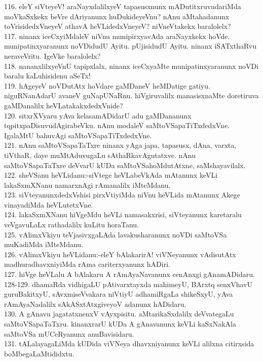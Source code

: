 \documentclass{article}
\begin{document}
116. eleY siVteyeV! araNayxdalilxyeV tapasusxnunx mADutitxruvudariMda moVkaSxkekx beVre dAriyanunx huDukideyeVnu? nAnu aMtahadanunx toVrisidedxVneyeV athavA heVLidedxVneyeV? niVneVtakekx baralolelx?\\
117. ninanx iceCxyiMdaleV niVnu munipirxyavAda araNayxkekx hoVde. munipatinxyaranunx noVDidudU Ayitu. pUjisidudU Ayitu. ninanx iSATxthaRvu neraveVritu. IgeVke baralolelx?\\
118. nananxlilxyeVnU tapipxlalx, ninanx iceCxyaMte munipatinxyaranunx noVDi baralu kaLuhisidenu aSeTx!\\
119. hAgeyeV noVDutAtx hoVdare gaMDaneV heMDatige gatiyu. niguRNanAdarU avaneV guNapUNaRnu. hiVgiruvalilx manasisxnaMte doretiruva gaMDanalilx heVLatakakxdedxVnide?\\
120. sitxrXVyaru yAva kelasamADidarU adu gaMDananunx tqpitxpaDisuvudAgirabeVku. nAnu modaleV saMtoVSapaTiTxdedxVne. IgalaMtU bahuvAgi saMtoVSapaTiTxdedxVne.\\
121. nAnu saMtoVSapaTaTxre ninanx yAga japa, tapasusx, dAna, varxta, tiVthaR, daye muMtAduvugaLu sAthaRkavAgutatxve. nAnu saMtoVSapaTaTxre deVvarU kUDa saMtoVSahoMdutAtxne, saMshayavilalx.\\
122. sheVSanu heVLidanu:-siVtege heVLabeVkAda mAtanunx keVLi lakaSxmXNanu namarxnAgi rAmanalilx iMteMdanu.\\
123. siVteyanunxdedxVshisi pirxVtiyiMda niVnu heVLida mAtanunx Akege vinayadiMda heVLutetxVne.\\
124. lakaSxmXNanu hiVgeMdu heVLi namasakxrisi, siVteyanunx karetaralu veVgavuLaLx rathadalilx kuLitu horaTanu.\\
125. vAlimxVkiyu teVjasivxgaLAda lavakusharanunx noVDi saMtoVSa muKadiMda iMteMdanu.\\
126. vAlimxVkiyu heVLidanu:-eleY bAlakarirA! viVNeyanunx vAdisutAtx madhuradhavxniyiMda rAma cariterxyanunx hADiri.\\
127. hiVge heVLalu A bAlakaru A rAmAyaNavanunx cenAnxgi gAnamADidaru.\\
128-129. dhamaRda vidhigaLU pAtivarxtayxda mahimeyU, BArxtq senxVhavU guruBakitxyU, sAvxmiseVvakara niVtiyU adhamiRgaLa shikeSxyU, yAva rAmAyaNadalilx sAkASxtAtxgiveyoV adanunx hADidaru.\\
130. A gAnavu jagatatxnenxV vAyxpisitu. aMtarikaSxdalilx deVvategaLu saMtoVSapaTaTxru. kinanxrarU kUDa A gAnavanunx keVLi kaSxNakAla saMtoVSa mUCeRyanunx anuBavisidaru.\\
131. tALalayagaLiMda kUDida viVNeya dhavxniyanunx keVLi alilxna citirxsida boMbegaLaMtididxtu.\\
\end{document}
